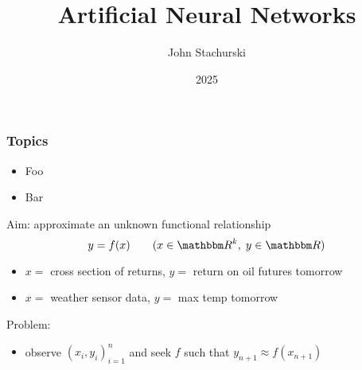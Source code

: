 

\title{Artificial Neural Networks}

\author{John Stachurski}


\date{2025}




\begin{frame}
  \titlepage
\end{frame}



\begin{frame}
    \frametitle{Topics}

    \begin{itemize}
        \item Foo
        \vspace{0.5em}
        \item Bar
        \vspace{0.5em}
    \end{itemize}

\end{frame}





\begin{frame}
    
    Aim: approximate an unknown functional relationship
    \begin{equation*}
        y = f(x)
        \qquad (x \in \RR^k, \; y \in \RR)
    \end{equation*}

    \Egs
    \begin{itemize}
        \item $x = $ cross section of returns, $y = $ return on oil futures tomorrow
        \vspace{0.5em}
        \item $x = $ weather sensor data, $y = $ max temp tomorrow
    \end{itemize}
        \vspace{0.5em}
        \vspace{0.5em}

    Problem:

    \begin{itemize}
        \item observe $(x_i, y_i)_{i=1}^n$ and seek $f$ such that $y_{n+1}
            \approx f(x_{n+1})$
    \end{itemize}


\end{frame}



